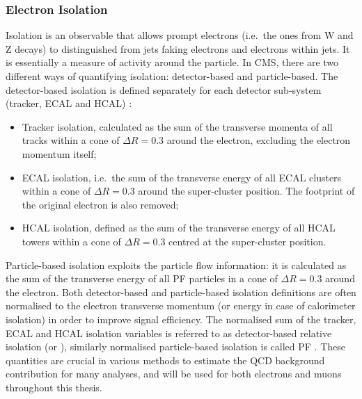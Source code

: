 \subsubsection{Electron Isolation}
\label{sss:electron_isolation}

Isolation is an observable that allows prompt electrons (i.e.\ the ones from W and Z decays) to distinguished from jets
faking electrons and electrons within jets. It is essentially a measure of activity around the particle. In CMS, there
are two different ways of quantifying isolation: detector-based and particle-based. The detector-based isolation is
defined separately for each detector sub-system (tracker, ECAL and HCAL) \autocite{electron_reconstruction_ID_7TeV}:

\begin{itemize}
  \item Tracker isolation, calculated as the sum of the transverse momenta of all tracks within a cone of $\Delta R =
  0.3$ around the electron, excluding the electron momentum itself;
  \item ECAL isolation, i.e.\ the sum of the transverse energy of all ECAL clusters within a cone of $\Delta R = 0.3$
  around the super-cluster position. The footprint of the original electron is also removed;
  \item HCAL isolation, defined as the sum of the transverse energy of all HCAL towers within a cone of $\Delta R = 0.3$
  centred at the super-cluster position.
\end{itemize}

Particle-based isolation exploits the particle flow information: it is calculated as the sum of the transverse energy of
all PF particles in a cone of $\Delta R = 0.3$ around the electron. Both detector-based and particle-based isolation
definitions are often normalised to the electron transverse momentum (or energy in case of calorimeter isolation) in
order to improve signal efficiency. The normalised sum of the tracker, ECAL and HCAL isolation variables is referred to
as detector-based relative isolation (or \reliso), similarly normalised particle-based isolation is called PF \reliso.
These quantities are crucial in various methods to estimate the QCD background contribution for many analyses, and will
be used for both electrons and muons throughout this thesis.

